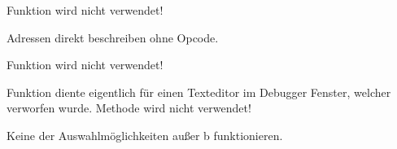 \begin{DoxyRefList}
Funktion wird nicht verwendet! 
\item[Global \doxylink{Compiler_8h_af11ec6d25a910e6938142f40348d7bd7}{mnem2bin} (char \texorpdfstring{$\ast$}{*}filename)]\label{todo__todo000002}%
%
Adressen direkt beschreiben ohne Opcode. 
\item[Global \doxylink{debugger_8c_aa84631c803d364c3a438579a70a652eb}{print\+BPs} (\doxylink{structBreakpoint}{Breakpoint} \texorpdfstring{$\ast$}{*}\texorpdfstring{$\ast$}{*}top, char status\mbox{[}\mbox{]}, int breakpoint\+Num)]\label{todo__todo000011}%
%
Funktion wird nicht verwendet! 
\item[Global \doxylink{debugger_8c_a89314e3a69768ea29b7e39a21b0979de}{print\+XY} (int x, int y)]\label{todo__todo000012}%
%
Funktion diente eigentlich für einen Texteditor im Debugger Fenster, welcher verworfen wurde. Methode wird nicht verwendet! 
\item[Global \doxylink{debugger_8c_a17f4436338d69d2a944cf5920d7e5a23}{read\+Register} (int y, int x)]\label{todo__todo000017}%
%
Keine der Auswahlmöglichkeiten außer \textquotesingle{}b\textquotesingle{} funktionieren.
\end{DoxyRefList}